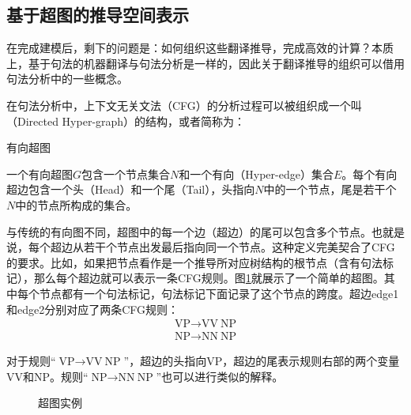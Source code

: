 \subsection{基于超图的推导空间表示}

\parinterval 在完成建模后，剩下的问题是：如何组织这些翻译推导，完成高效的计算？本质上，基于句法的机器翻译与句法分析是一样的，因此关于翻译推导的组织可以借用句法分析中的一些概念。

\parinterval 在句法分析中，上下文无关文法（CFG）的分析过程可以被组织成一个叫{\small{}}（Directed Hyper-graph）的结构，或者简称为{\small{}}\cite{ilprints729}：

\vspace{0.5em}
\begin{definition} 有向超图

{\small
一个有向超图$G$包含一个节点集合$N$和一个有向{\small{}}（Hyper-edge）集合$E$。每个有向超边包含一个头（Head）和一个尾（Tail），头指向$N$中的一个节点，尾是若干个$N$中的节点所构成的集合。
}
\end{definition}

\parinterval 与传统的有向图不同，超图中的每一个边（超边）的尾可以包含多个节点。也就是说，每个超边从若干个节点出发最后指向同一个节点。这种定义完美契合了CFG的要求。比如，如果把节点看作是一个推导所对应树结构的根节点（含有句法标记），那么每个超边就可以表示一条CFG规则。图\ref{fig:4-64}就展示了一个简单的超图。其中每个节点都有一个句法标记，句法标记下面记录了这个节点的跨度。超边edge1和edge2分别对应了两条CFG规则：
\begin{eqnarray}
\textrm{VP} \rightarrow \textrm{VV}\ \textrm{NP} \nonumber \\
\textrm{NP} \rightarrow \textrm{NN}\ \textrm{NP} \nonumber
\end{eqnarray}

\parinterval 对于规则``$\textrm{VP} \rightarrow \textrm{VV}\ \textrm{NP}$''，超边的头指向VP，超边的尾表示规则右部的两个变量VV和NP。规则``$\textrm{NP} \rightarrow \textrm{NN}\ \textrm{NP}$''也可以进行类似的解释。

\begin{figure}[htp]
\centering

\caption{超图实例}
\label{fig:4-64}
\end{figure}

